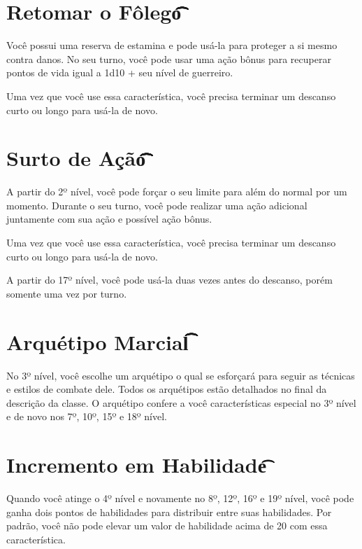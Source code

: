 \documentclass{RPG_Adventure}[2021/10/20]
\begin{document}
\section*{Retomar o Fôlego\t\t\t\t\t\t\t}%
\label{sec:retomar_o_folego}

Você possui uma reserva de estamina e pode usá-la para proteger a si mesmo
contra danos. No seu turno, você pode usar uma ação bônus para recuperar pontos
de vida igual a 1d10 + seu nível de guerreiro.

Uma vez que você use essa característica, você precisa terminar um descanso
curto ou longo para usá-la de novo.

\section*{Surto de Ação\t\t\t\t\t\t\t\t\t\t}%
\label{sec:surto_de_acao}

A partir do 2º nível, você pode forçar o seu limite para além do normal por um
momento. Durante o seu turno, você pode realizar uma ação adicional juntamente
com sua ação e possível ação bônus.

Uma vez que você use essa característica, você precisa terminar um descanso
curto ou longo para usá-la de novo.

A partir do 17º nível, você pode usá-la duas vezes antes do descanso, porém
somente uma vez por turno.

\section*{Arquétipo Marcial\t\t\t\t\t\t\t}%
\label{sec:arquetipo_marcial}

No 3º nível, você escolhe um arquétipo o qual se esforçará para seguir as
técnicas e estilos de combate dele. Todos os arquétipos estão detalhados no
final da descrição da classe. O arquétipo confere a você características
especial no 3º nível e de novo nos 7º, 10º, 15º e 18º nível.

\section*{Incremento em Habilidade\t\t}%
\label{sec:incremento_em_habilidade}

Quando você atinge o 4º nível e novamente no 8º, 12º, 16º e 19º nível, você pode
ganha dois pontos de habilidades para distribuir entre suas habilidades. Por
padrão, você não pode elevar um valor de habilidade acima de 20 com essa
característica.
\end{document}
